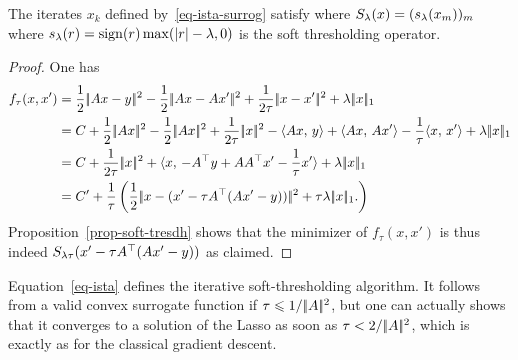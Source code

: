 \begin{prop}
	The iterates $x_k$ defined by~\eqref{eq-ista-surrog} satisfy
	where $S_\lambda(x) = (  s_\lambda(x_m) )_m$ where $s_\lambda(r) = \operatorname{sign}(r) \max(|r|-\lambda,0)$ is the soft thresholding operator.
\end{prop}
\begin{proof}
	One has 
	\begin{align*}
		f_\tau(x,x') 
			&= \frac{1}{2}\norm{Ax-y}^2 - \frac{1}{2}\norm{Ax-Ax'}^2 + \frac{1}{2\tau}\norm{x-x'}^2 + \la \norm{x}_1 \\
			& = C + \frac{1}{2}\norm{Ax}^2-\frac{1}{2}\norm{Ax}^2+\frac{1}{2\tau}\norm{x}^2
			- \dotp{Ax}{y} + \dotp{Ax}{Ax'} - \frac{1}{\tau}\dotp{x}{x'}
			+ \la \norm{x}_1 \\
			& = C + \frac{1}{2\tau}\norm{x}^2 + \dotp{x}{ -A^\top y+AA^\top x'-\frac{1}{\tau}x' } + \la \norm{x}_1 \\
			&= C' + \frac{1}{\tau}
				\pa{
					\frac{1}{2}\norm{x-(x'-\tau A^\top(Ax'-y))}^2
					+ \tau \la \norm{x}_1.
				}
	\end{align*}
	Proposition~\eqref{prop-soft-tresdh} shows that the minimizer of $f_\tau(x,x')$ is thus 
	indeed $S_{\lambda\tau}( x' - \tau A^\top( A x' - y ) )$ as claimed.
\end{proof}

Equation~\eqref{eq-ista} defines the iterative soft-thresholding algorithm. It follows from a valid convex surrogate function if $\tau \leqslant 1/|\!| A |\!|^2$, but one can actually shows that it converges to a solution of the Lasso as soon as $\tau < 2/|\!| A |\!|^2$, which is exactly as for the classical gradient descent. 


